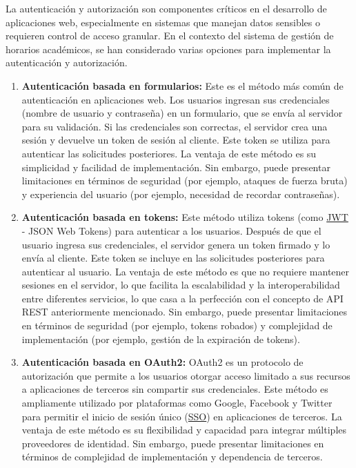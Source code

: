 La autenticación y autorización son componentes críticos en el desarrollo de aplicaciones web, especialmente en sistemas que manejan datos sensibles o requieren control de acceso granular. En el contexto del sistema de gestión de horarios académicos, se han considerado varias opciones para implementar la autenticación y autorización.
\begin{enumerate}
    \item \textbf{Autenticación basada en formularios\cite{auth_form}:} Este es el método más común de autenticación en aplicaciones web. Los usuarios ingresan sus credenciales (nombre de usuario y contraseña) en un formulario, que se envía al servidor para su validación. Si las credenciales son correctas, el servidor crea una sesión y devuelve un token de sesión al cliente. Este token se utiliza para autenticar las solicitudes posteriores.\newline
        La ventaja de este método es su simplicidad y facilidad de implementación. Sin embargo, puede presentar limitaciones en términos de seguridad (por ejemplo, ataques de fuerza bruta) y experiencia del usuario (por ejemplo, necesidad de recordar contraseñas).
    \item \textbf{Autenticación basada en tokens\cite{auth_jwt}:} Este método utiliza tokens (como \hyperlink{jwt}{JWT} - JSON Web Tokens) para autenticar a los usuarios. Después de que el usuario ingresa sus credenciales, el servidor genera un token firmado y lo envía al cliente. Este token se incluye en las solicitudes posteriores para autenticar al usuario. La ventaja de este método es que no requiere mantener sesiones en el servidor, lo que facilita la escalabilidad y la interoperabilidad entre diferentes servicios, lo que casa a la perfección con el concepto de API REST anteriormente mencionado.\newline
        Sin embargo, puede presentar limitaciones en términos de seguridad (por ejemplo, tokens robados) y complejidad de implementación (por ejemplo, gestión de la expiración de tokens).
    \item \textbf{Autenticación basada en OAuth2\cite{auth_mfa}:} OAuth2 es un protocolo de autorización que permite a los usuarios otorgar acceso limitado a sus recursos a aplicaciones de terceros sin compartir sus credenciales. Este método es ampliamente utilizado por plataformas como Google, Facebook y Twitter para permitir el inicio de sesión único (\hyperlink{sso}{SSO}) en aplicaciones de terceros.\newline
        La ventaja de este método es su flexibilidad y capacidad para integrar múltiples proveedores de identidad. Sin embargo, puede presentar limitaciones en términos de complejidad de implementación y dependencia de terceros.

\end{enumerate}
